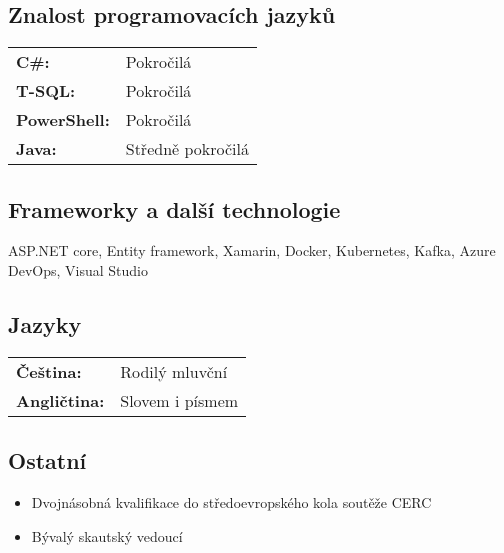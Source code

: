 \documentclass[a4paper]{article}
\begin{document}
\subsection*{Znalost programovacích jazyků}
\begin{tabular}{>{\bfseries}l l}
    C\#: & Pokročilá \\
    T-SQL: & Pokročilá \\
    PowerShell: & Pokročilá \\
    Java: & Středně pokročilá \\
\end{tabular}

\subsection*{Frameworky a další technologie}
ASP.NET core, Entity framework, Xamarin, Docker, Kubernetes, Kafka, Azure DevOps, Visual Studio

\subsection*{Jazyky}
\begin{tabular}{>{\bfseries}l l}
    Čeština: & Rodilý mluvční \\
    Angličtina: & Slovem i písmem
\end{tabular}

\subsection*{Ostatní}
\begin{itemize}
    \item Dvojnásobná kvalifikace do středoevropského kola soutěže CERC
    \item Bývalý skautský vedoucí
\end{itemize}
\end{document}
